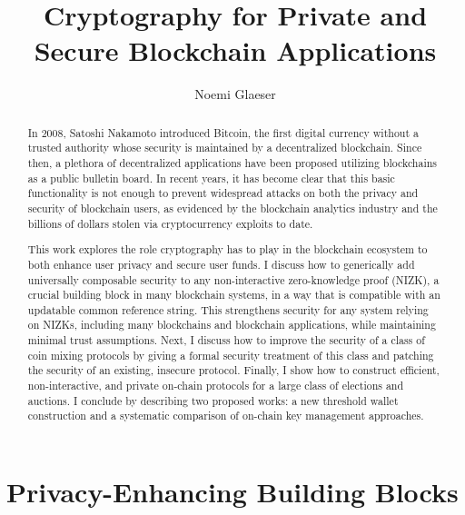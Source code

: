 \documentclass{article}
\title{Cryptography for Private and Secure Blockchain Applications}
\author{Noemi Glaeser}
\date{}
\newcommand{\noemi}[1]{\textcolor{magenta}{Noemi: #1}}
\begin{document}
\maketitle
\begin{abstract}
In 2008, Satoshi Nakamoto introduced Bitcoin, the first digital currency without a trusted authority whose security is maintained by a decentralized blockchain. Since then, a plethora of decentralized applications have been proposed utilizing blockchains as a public bulletin board. In recent years, it has become clear that this basic functionality is not enough to prevent widespread attacks on both the privacy and security of blockchain users, as evidenced by the blockchain analytics industry and the billions of dollars stolen via cryptocurrency exploits to date. 

This work explores the role cryptography has to play in the blockchain ecosystem to both enhance user privacy and secure user funds. I discuss how to generically add universally composable security to any non-interactive zero-knowledge proof (NIZK), a crucial building block in many blockchain systems, in a way that is compatible with an updatable common reference string. This strengthens security for any system relying on NIZKs, including many blockchains and blockchain applications, while maintaining minimal trust assumptions. Next, I discuss how to improve the security of a class of coin mixing protocols by giving a formal security treatment of this class and patching the security of an existing, insecure protocol. Finally, I show how to construct efficient, non-interactive, and private on-chain protocols for a large class of elections and auctions. I conclude by describing two proposed works: a new threshold wallet construction and a systematic comparison of on-chain key management approaches.

\end{abstract}

\tableofcontents
\newpage



\section{Privacy-Enhancing Building Blocks}\label{sec:building-blocks}
\end{document}
